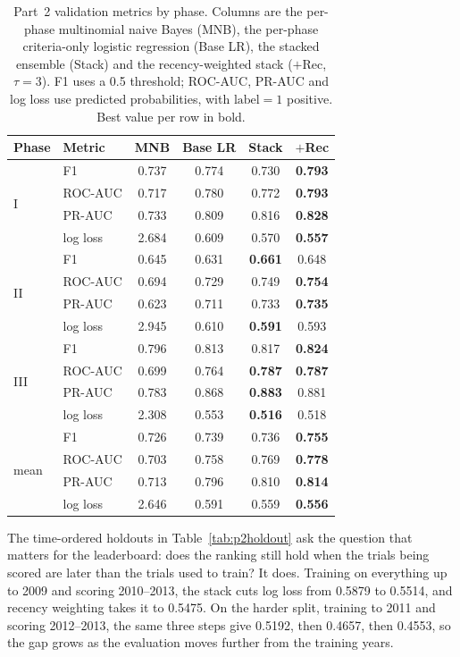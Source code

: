 \begin{table}[t]
\centering\small
\setlength{\tabcolsep}{3.5pt}
\begin{tabular}{llcccc}
\toprule
Phase & Metric & MNB & Base LR & Stack & $+$Rec \\
\midrule
\multirow{4}{*}{I}
 & F1       & 0.737 & 0.774 & 0.730 & \textbf{0.793} \\
 & ROC-AUC  & 0.717 & 0.780 & 0.772 & \textbf{0.793} \\
 & PR-AUC   & 0.733 & 0.809 & 0.816 & \textbf{0.828} \\
 & log loss & 2.684 & 0.609 & 0.570 & \textbf{0.557} \\
\midrule
\multirow{4}{*}{II}
 & F1       & 0.645 & 0.631 & \textbf{0.661} & 0.648 \\
 & ROC-AUC  & 0.694 & 0.729 & 0.749 & \textbf{0.754} \\
 & PR-AUC   & 0.623 & 0.711 & 0.733 & \textbf{0.735} \\
 & log loss & 2.945 & 0.610 & \textbf{0.591} & 0.593 \\
\midrule
\multirow{4}{*}{III}
 & F1       & 0.796 & 0.813 & 0.817 & \textbf{0.824} \\
 & ROC-AUC  & 0.699 & 0.764 & \textbf{0.787} & \textbf{0.787} \\
 & PR-AUC   & 0.783 & 0.868 & \textbf{0.883} & 0.881 \\
 & log loss & 2.308 & 0.553 & \textbf{0.516} & 0.518 \\
\midrule
\multirow{4}{*}{mean}
 & F1       & 0.726 & 0.739 & 0.736 & \textbf{0.755} \\
 & ROC-AUC  & 0.703 & 0.758 & 0.769 & \textbf{0.778} \\
 & PR-AUC   & 0.713 & 0.796 & 0.810 & \textbf{0.814} \\
 & log loss & 2.646 & 0.591 & 0.559 & \textbf{0.556} \\
\bottomrule
\end{tabular}
\caption{Part~2 validation metrics by phase. Columns are the per-phase
multinomial naive Bayes (MNB), the per-phase criteria-only logistic regression
(Base LR), the stacked ensemble (Stack) and the recency-weighted stack
($+$Rec, $\tau{=}3$). F1 uses a 0.5 threshold; ROC-AUC, PR-AUC and log loss use
predicted probabilities, with $\text{label}=1$ positive. Best value per row in
bold.}
\label{tab:p2val}
\end{table}

The time-ordered holdouts in Table~\ref{tab:p2holdout} ask the question that
matters for the leaderboard: does the ranking still hold when the trials being
scored are later than the trials used to train? It does. Training on everything up
to 2009 and scoring 2010--2013, the stack cuts log loss from 0.5879 to 0.5514, and
recency weighting takes it to 0.5475. On the harder split, training to 2011 and
scoring 2012--2013, the same three steps give 0.5192, then 0.4657, then 0.4553, so
the gap grows as the evaluation moves further from the training years.

